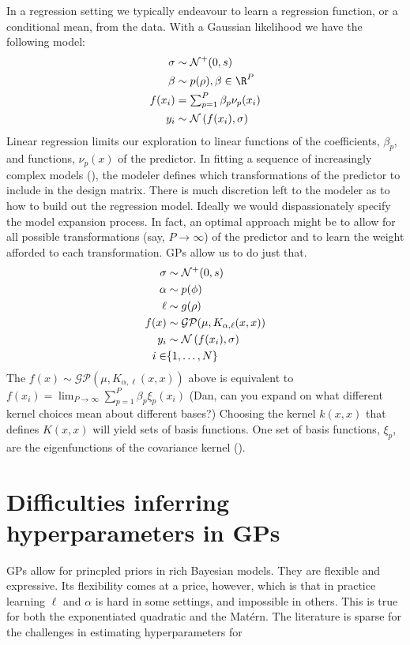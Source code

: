 \documentclass{article}
\newcommand{\lp}{\ensuremath{\left(}}
\newcommand{\rp}{\ensuremath{\right)}}
\begin{document}
In a regression setting we typically endeavour to learn a regression function,
or a conditional mean, from the data. With a Gaussian likelihood we have the
following model:
%
\begin{align*}
  \sigma & \sim \mathcal{N}^+(0, s) \\
  \beta & \sim p(\rho), \beta \in \R^P \\
  f(x_i) & = \textstyle \sum_{p=1}^P \beta_p \nu_p(x_i) \\
  y_i & \sim \mathcal{N}\lp f(x_i),
  \sigma\rp 
\end{align*}
%
Linear regression limits our exploration to linear functions of the
coefficients, $\beta_p$, and functions, $\nu_p(x)$ of the predictor. In fitting
a sequence of increasingly complex models (\citet{gelman2014bayesian}), the
modeler defines which transformations of the predictor to include in the design
matrix. There is much discretion left to the modeler as to how to build out the
regression model. Ideally we would dispassionately specify the model expansion
process. In fact, an optimal approach might be to allow for all possible
transformations (say, $P \rightarrow \infty$) of the predictor and to learn the
weight afforded to each transformation. GPs allow us to do just that.
%
\begin{align*}
  \sigma & \sim \mathcal{N}^+(0, s) \\
  \alpha & \sim p(\phi) \\
  \ell & \sim g(\rho) \\
  f(x) & \sim \mathcal{GP}(\mu, K_{\alpha, \ell}(x, x)) \\
  y_i & \sim \mathcal{N}\lp f(x_i),
  \sigma\rp  \\
  i \in & \{1, \dots, N\}
\end{align*}
%
The $f(x) \sim \mathcal{GP}(\mu, K_{\alpha, \ell}(x, x))$ above is equivalent to
$f(x_i)  = \textstyle \lim_{P \to \infty} \sum_{p=1}^P \beta_p \xi_p(x_i)$
(Dan, can you expand on what different kernel choices mean about different bases?)
Choosing the kernel $k(x, x)$ that defines $K(x, x)$ will yield sets of 
basis functions. One set of basis functions, $\xi_p$, are the eigenfunctions 
of the covariance kernel (\citet{rasmussen2005gaussian}).

\section{Difficulties inferring hyperparameters in GPs}

GPs allow for princpled priors in rich Bayesian models. They are flexible and
expressive. Its flexibility comes at a price, however, which is that in
practice learning $\ell$ and $\alpha$ is hard in some settings, and impossible
in others. This is true for both the exponentiated quadratic and the 
Mat\'{e}rn. The literature is sparse for the challenges in estimating hyperparameters
for 
\end{document}
